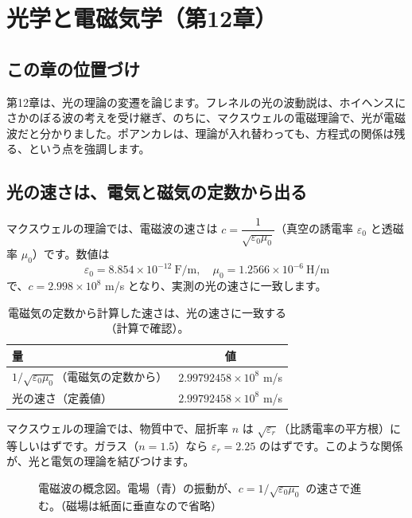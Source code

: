 \documentclass[a4paper,11pt,openany]{ltjsbook}
\begin{document}
\chapter{光学と電磁気学（第12章）}

\section{この章の位置づけ}

第12章は、光の理論の変遷を論じます。フレネルの光の波動説は、ホイヘンスにさかのぼる波の考えを受け継ぎ、のちに、マクスウェルの電磁理論で、光が電磁波だと分かりました。ポアンカレは、理論が入れ替わっても、方程式の関係は残る、という点を強調します。

\section{光の速さは、電気と磁気の定数から出る}

マクスウェルの理論では、電磁波の速さは $c=\dfrac1{\sqrt{\varepsilon_0\mu_0}}$（真空の誘電率 $\varepsilon_0$ と透磁率 $\mu_0$）です。数値は
\[
\varepsilon_0=8.854\times10^{-12}\ \text{F/m},\quad\mu_0=1.2566\times10^{-6}\ \text{H/m}
\]
で、$c=2.998\times10^{8}$ m/s となり、実測の光の速さに一致します。

\begin{table}[htbp]
\centering
\begin{tabular}{lc}
\toprule
量 & 値\\
\midrule
$1/\sqrt{\varepsilon_0\mu_0}$（電磁気の定数から） & $2.99792458\times10^8$ m/s\\
光の速さ（定義値） & $2.99792458\times10^8$ m/s\\
\bottomrule
\end{tabular}
\caption{電磁気の定数から計算した速さは、光の速さに一致する（計算で確認）。}
\end{table}

マクスウェルの理論では、物質中で、屈折率 $n$ は $\sqrt{\varepsilon_r}$（比誘電率の平方根）に等しいはずです。ガラス（$n=1.5$）なら $\varepsilon_r=2.25$ のはずです。このような関係が、光と電気の理論を結びつけます。

\begin{figure}[htbp]
\centering
{}
\caption{電磁波の概念図。電場（青）の振動が、$c=1/\sqrt{\varepsilon_0\mu_0}$ の速さで進む。（磁場は紙面に垂直なので省略）}
\end{figure}
\end{document}
